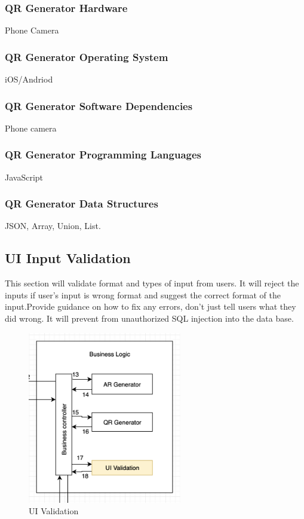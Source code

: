 \subsubsection{QR Generator Hardware}
Phone Camera

\subsubsection{QR Generator Operating System}
iOS/Andriod

\subsubsection{QR Generator Software Dependencies}
Phone camera

\subsubsection{QR Generator Programming Languages}
JavaScript

\subsubsection{QR Generator Data Structures}
JSON, Array, Union, List.



\subsection{UI Input Validation}
This section will validate format and types of input from users. It will reject the inputs if user's input is wrong format and suggest the correct format of the input.Provide guidance on how to fix any errors, don't just tell users what they did wrong. It will prevent from unauthorized SQL injection into the data base.

\begin{figure}[h!]
	\centering
 	\includegraphics[width=0.60\textwidth]{images/uivalidation}
 \caption{UI Validation}
\end{figure}

